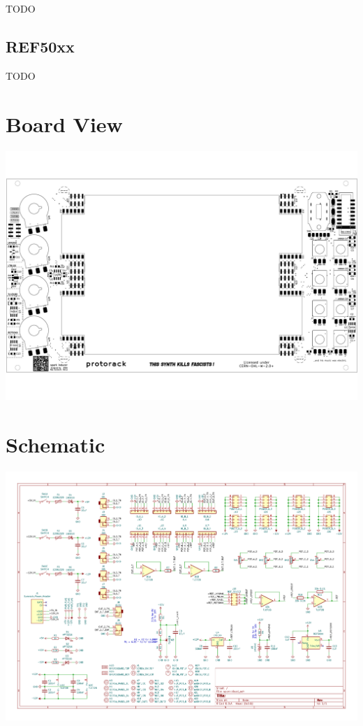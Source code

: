 \documentclass[12pt, a4paper]{article}
\begin{document}
TODO

\subsection*{REF50xx}

TODO

\pagebreak
\section*{Board View}
\includegraphics[angle=90, origin=c, width=\textwidth]{pdf/back_silkscreen.pdf}

\pagebreak
\section*{Schematic}
\includegraphics[angle=90, origin=c, width=\textwidth]{pdf/schematic.pdf}
\end{document}
